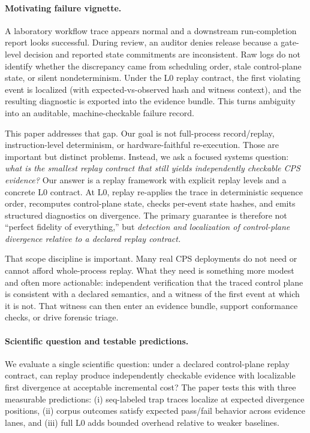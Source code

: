 \documentclass[11pt]{article}
\newcommand{\Lzero}{\ensuremath{\mathrm{L0}}}
\begin{document}
\paragraph{Motivating failure vignette.}
A laboratory workflow trace appears normal and a downstream run-completion report looks successful. During review, an auditor denies release because a gate-level decision and reported state commitments are inconsistent. Raw logs do not identify whether the discrepancy came from scheduling order, stale control-plane state, or silent nondeterminism. Under the \Lzero{} replay contract, the first violating event is localized (with expected-vs-observed hash and witness context), and the resulting diagnostic is exported into the evidence bundle. This turns ambiguity into an auditable, machine-checkable failure record.

This paper addresses that gap. Our goal is not full-process record/replay, instruction-level determinism, or hardware-faithful re-execution. Those are important but distinct problems. Instead, we ask a focused systems question: \emph{what is the smallest replay contract that still yields independently checkable CPS evidence?} Our answer is a replay framework with explicit replay levels and a concrete \Lzero{} contract. At \Lzero{}, replay re-applies the trace in deterministic sequence order, recomputes control-plane state, checks per-event state hashes, and emits structured diagnostics on divergence. The primary guarantee is therefore not ``perfect fidelity of everything,'' but \emph{detection and localization of control-plane divergence relative to a declared replay contract.}

That scope discipline is important. Many real CPS deployments do not need or cannot afford whole-process replay. What they need is something more modest and often more actionable: independent verification that the traced control plane is consistent with a declared semantics, and a witness of the first event at which it is not. That witness can then enter an evidence bundle, support conformance checks, or drive forensic triage.

\paragraph{Scientific question and testable predictions.}
We evaluate a single scientific question: under a declared control-plane replay contract, can replay produce independently checkable evidence with localizable first divergence at acceptable incremental cost? The paper tests this with three measurable predictions: (i) seq-labeled trap traces localize at expected divergence positions, (ii) corpus outcomes satisfy expected pass/fail behavior across evidence lanes, and (iii) full \Lzero{} adds bounded overhead relative to weaker baselines.
\end{document}
